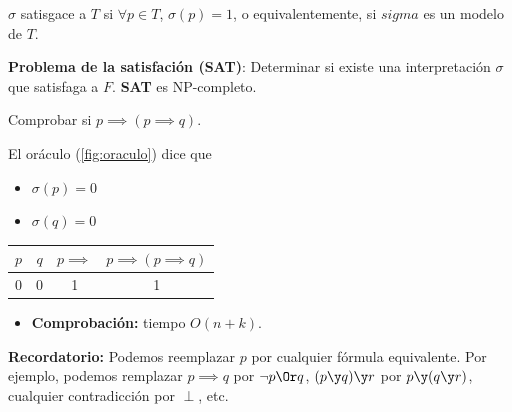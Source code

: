 \begin{defn}[Satisfación]
	$\sigma$ satisgace a $T$ si $\forall p \in T$, $\sigma(p) = 1$, o equivalentemente, si $sigma$ es un modelo de $T$.
\end{defn}

\begin{mdframed}
	\textbf{Problema de la satisfación (SAT)}: Determinar si existe una interpretación $\sigma$ que satisfaga a $F$. \textbf{SAT} es {NP-completo}.
\end{mdframed}

\begin{example}
	Comprobar si $p\implies (p\implies q)$.
	
	El oráculo (\ref{fig:oraculo}) dice que
	\begin{itemize}
		\item $\sigma(p) = 0$
		\item $\sigma(q) = 0$
	\end{itemize}
	\begin{center}
		\begin{tabular}{|c|c|c|c|}
			\hline
			$p$ & $q$ & $p\implies$ & $p\implies(p\implies q)$\\
			\hline
			0 & 0 & 1 & 1\\
			\hline 		
		\end{tabular}
	\end{center}
	\begin{itemize}
		\item \textbf{Comprobación:} tiempo $O(n+k)$.
	\end{itemize}
\end{example}

\textbf{Recordatorio:} Podemos reemplazar $p$ por cualquier fórmula equivalente. Por ejemplo, podemos remplazar $p\implies q$ por $\neg p \Or q$, $(p\y q)\y r$ por $p\y (q\y r)$, cualquier contradicción por $\perp$, etc.

